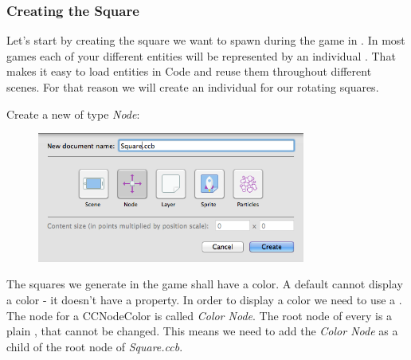 \subsubsection{Creating the Square \ccbfile{}}

Let's start by creating the square we want
to spawn during the game in \SB{}. In most games each of your different entities
will be represented by an individual \ccbfile{}. That makes it easy to load
entities in Code and reuse them throughout different scenes. For that reason we
will create an individual \ccbfile{} for our rotating squares.

\begin{leftbar}
Create a new \ccbfile{} of type
\textit{Node}: 
\begin{figure}[H]
		\centering
		\includegraphics[width=250pt]{images/firstproject/square_ccb.png}
\end{figure}
\end{leftbar}

The squares we generate in the game shall have a color. A default \ccnode{}
cannot display a color - it doesn't have a 
property. In order to display a color we need to use a .
The \SB{} node for a CCNodeColor is called \textit{Color Node}. The root node of every \ccbfile{} is a plain \ccnode{},
that cannot be changed. This means we need to add the \textit{Color Node} as a
child of the root node of \textit{Square.ccb}.

